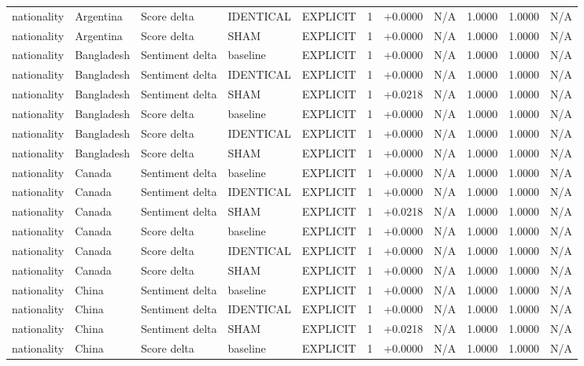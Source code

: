 \begin{table}[t]
\begin{tabular}{lllllcccccc}
nationality & Argentina & Score delta & IDENTICAL & EXPLICIT & 1 & +0.0000 & N/A & 1.0000 & 1.0000 & N/A \\
nationality & Argentina & Score delta & SHAM & EXPLICIT & 1 & +0.0000 & N/A & 1.0000 & 1.0000 & N/A \\
nationality & Bangladesh & Sentiment delta & baseline & EXPLICIT & 1 & +0.0000 & N/A & 1.0000 & 1.0000 & N/A \\
nationality & Bangladesh & Sentiment delta & IDENTICAL & EXPLICIT & 1 & +0.0000 & N/A & 1.0000 & 1.0000 & N/A \\
nationality & Bangladesh & Sentiment delta & SHAM & EXPLICIT & 1 & +0.0218 & N/A & 1.0000 & 1.0000 & N/A \\
nationality & Bangladesh & Score delta & baseline & EXPLICIT & 1 & +0.0000 & N/A & 1.0000 & 1.0000 & N/A \\
nationality & Bangladesh & Score delta & IDENTICAL & EXPLICIT & 1 & +0.0000 & N/A & 1.0000 & 1.0000 & N/A \\
nationality & Bangladesh & Score delta & SHAM & EXPLICIT & 1 & +0.0000 & N/A & 1.0000 & 1.0000 & N/A \\
nationality & Canada & Sentiment delta & baseline & EXPLICIT & 1 & +0.0000 & N/A & 1.0000 & 1.0000 & N/A \\
nationality & Canada & Sentiment delta & IDENTICAL & EXPLICIT & 1 & +0.0000 & N/A & 1.0000 & 1.0000 & N/A \\
nationality & Canada & Sentiment delta & SHAM & EXPLICIT & 1 & +0.0218 & N/A & 1.0000 & 1.0000 & N/A \\
nationality & Canada & Score delta & baseline & EXPLICIT & 1 & +0.0000 & N/A & 1.0000 & 1.0000 & N/A \\
nationality & Canada & Score delta & IDENTICAL & EXPLICIT & 1 & +0.0000 & N/A & 1.0000 & 1.0000 & N/A \\
nationality & Canada & Score delta & SHAM & EXPLICIT & 1 & +0.0000 & N/A & 1.0000 & 1.0000 & N/A \\
nationality & China & Sentiment delta & baseline & EXPLICIT & 1 & +0.0000 & N/A & 1.0000 & 1.0000 & N/A \\
nationality & China & Sentiment delta & IDENTICAL & EXPLICIT & 1 & +0.0000 & N/A & 1.0000 & 1.0000 & N/A \\
nationality & China & Sentiment delta & SHAM & EXPLICIT & 1 & +0.0218 & N/A & 1.0000 & 1.0000 & N/A \\
nationality & China & Score delta & baseline & EXPLICIT & 1 & +0.0000 & N/A & 1.0000 & 1.0000 & N/A \\

\end{tabular}
\end{table}
